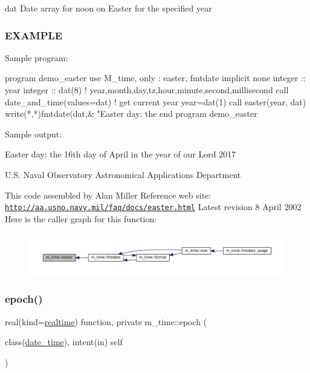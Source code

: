 dat Date array for noon on Easter for the specified year

\subsubsection*{E\+X\+A\+M\+P\+LE}

\begin{DoxyVerb}Sample program:

 program demo_easter
 use M_time, only : easter, fmtdate
 implicit none
 integer :: year
 integer :: dat(8) ! year,month,day,tz,hour,minute,second,millisecond
   call date_and_time(values=dat)  ! get current year
   year=dat(1)
   call easter(year, dat)
   write(*,*)fmtdate(dat,&
   "Easter day: the %
 end program demo_easter

Sample output:

 Easter day: the 16th day of April in the year of our Lord 2017 \end{DoxyVerb}


U.\+S. Naval Observatory Astronomical Applications Department

This code assembled by Alan Miller Reference web site\+: \href{http://aa.usno.navy.mil/faq/docs/easter.html}{\tt http\+://aa.\+usno.\+navy.\+mil/faq/docs/easter.\+html} Latest revision 8 April 2002 Here is the caller graph for this function\+:\nopagebreak
\begin{figure}[H]
\begin{center}
\leavevmode
\includegraphics[width=350pt]{namespacem__time_a5ccb70e20160fcf26bb403dbff1f138a_icgraph}
\end{center}
\end{figure}
\mbox{\label{namespacem__time_a64abb0c3f90cb0ae1358ef55ce03c175}} 
\subsubsection{\texorpdfstring{epoch()}{epoch()}}
{\footnotesize\ttfamily real(kind=\mbox{\hyperlink{namespacem__time_ac10ea9e8d59ec74eaa7d89f2517d7422}{realtime}}) function, private m\+\_\+time\+::epoch (\begin{DoxyParamCaption}\item[{class(\mbox{\hyperlink{structm__time_1_1date__time}{date\+\_\+time}}), intent(in)}]{self }\end{DoxyParamCaption})\hspace{0.3cm}{\ttfamily [private]}}



